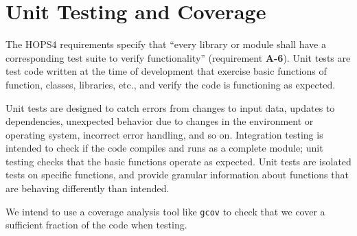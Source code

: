 %
%
\section{Unit Testing and Coverage}
\label{sec:unit}

The HOPS4 requirements specify that ``every library or module shall have a corresponding test suite to verify functionality'' (requirement \textbf{A-6}). Unit tests are test code written at the time of development that exercise basic functions of function, classes, libraries, etc., and verify the code is functioning as expected.

Unit tests are designed to catch errors from changes to input data, updates to dependencies, unexpected behavior due to changes in the environment or operating system, incorrect error handling, and so on. Integration testing is intended to check if the code compiles and runs as a complete module; unit testing checks that the basic functions operate as expected. Unit tests are isolated tests on specific functions, and provide granular information about functions that are behaving differently than intended.

We intend to use a coverage analysis tool like \texttt{gcov} to check that we cover a sufficient fraction of the code when testing.


%
%
